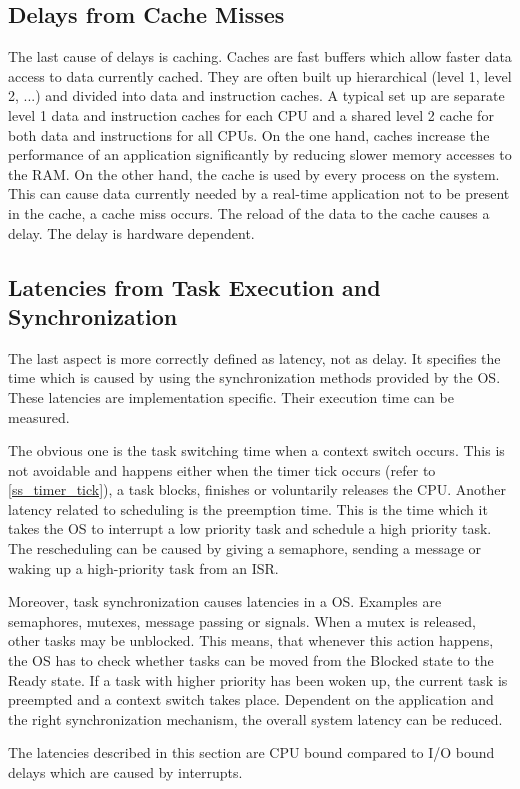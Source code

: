 \subsection{Delays from Cache Misses}
The last cause of delays is caching.
Caches are fast buffers which allow faster data access to data currently cached.
They are often built up hierarchical (level 1, level 2, ...) and divided into data and instruction caches.
A typical set up are separate level 1 data and instruction caches for each \ac{CPU} and a shared level 2 cache for both data and instructions for all \acp{CPU}.
On the one hand, caches increase the performance of an application significantly by reducing slower memory accesses to the \ac{RAM}. 
On the other hand, the cache is used by every process on the system.
This can cause data currently needed by a real-time application not to be present in the cache, a cache miss occurs.
The reload of the data to the cache causes a delay.
The delay is hardware dependent. 

\subsection{Latencies from Task Execution and Synchronization}
The last aspect is more correctly defined as latency, not as delay.
It specifies the time which is caused by using the synchronization methods provided by the \ac{OS}. 
These latencies are implementation specific.
Their execution time can be measured.
\par
The obvious one is the task switching time when a context switch occurs.
This is not avoidable and happens either when the timer tick occurs (refer to \ref{ss_timer_tick}), a task blocks, finishes or voluntarily releases the \ac{CPU}.
Another latency related to scheduling is the preemption time.
This is the time which it takes the \ac{OS} to interrupt a low priority task and schedule a high priority task.
The rescheduling can be caused by giving a semaphore, sending a message or waking up a high-priority task from an \ac{ISR}.
\par
Moreover, task synchronization causes latencies in a \ac{OS}.
Examples are semaphores, mutexes, message passing or signals. 
When a mutex is released, other tasks may be unblocked.
This means, that whenever this action happens, the \ac{OS} has to check whether tasks can be moved from the Blocked state to the Ready state.
If a task with higher priority has been woken up, the current task is preempted and a context switch takes place.
Dependent on the application and the right synchronization mechanism, the overall system latency can be reduced.
\par
The latencies described in this section are \ac{CPU} bound compared to \ac{I/O} bound delays which are caused by interrupts.
 
